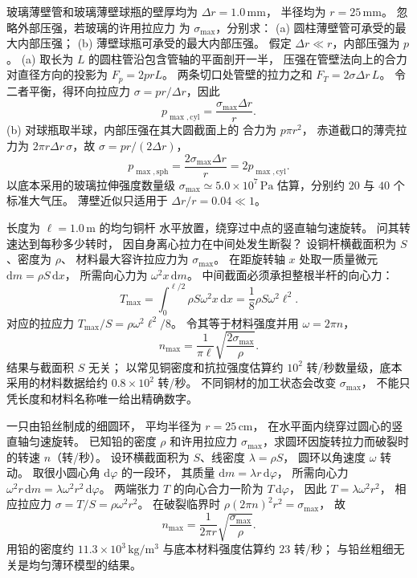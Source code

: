 
玻璃薄壁管和玻璃薄壁球瓶的壁厚均为
$\Delta r=1.0\,\mathrm{mm}$，
半径均为 $r=25\,\mathrm{mm}$。
忽略外部压强，若玻璃的许用拉应力
为 $\sigma_{\max}$，分别求：
(a) 圆柱薄壁管可承受的最大内部压强；
(b) 薄壁球瓶可承受的最大内部压强。
\exsolution
假定 $\Delta r\ll r$，内部压强为 $p$。
(a) 取长为 $L$ 的圆柱管沿包含管轴的平面剖开一半，
压强在管壁法向上的合力对直径方向的投影为
$F_p=2prL$。
两条切口处管壁的拉力之和
$F_T=2\sigma\Delta r\,L$。
令二者平衡，得环向拉应力
$\sigma=pr/\Delta r$，因此
\[
\boxed{p_{\max,\mathrm{cyl}}=
\frac{\sigma_{\max}\Delta r}{r}}.
\]
(b) 对球瓶取半球，内部压强在其大圆截面上的
合力为 $p\pi r^2$，
赤道截口的薄壳拉力为
$2\pi r\Delta r\,\sigma$，故
$\sigma=pr/(2\Delta r)$，
\[
\boxed{p_{\max,\mathrm{sph}}=
\frac{2\sigma_{\max}\Delta r}{r}
=2p_{\max,\mathrm{cyl}}}.
\]
\excheck 以底本采用的玻璃拉伸强度数量级
$\sigma_{\max}\simeq5.0\times10^7\,\mathrm{Pa}$
估算，分别约 $20$ 与 $40$ 个标准大气压。
薄壁近似只适用于 $\Delta r/r=0.04\ll1$。

长度为 $\ell=1.0\,\mathrm m$ 的均匀铜杆
水平放置，绕穿过中点的竖直轴匀速旋转。
问其转速达到每秒多少转时，
因自身离心拉力在中间处发生断裂？
\exsolution
设铜杆横截面积为 $S$、密度为 $\rho$、
材料最大容许拉应力为 $\sigma_{\max}$。
在距旋转轴 $x$ 处取一质量微元
$\mathrm dm=\rho S\,\mathrm dx$，
所需向心力为
$\omega^2x\,\mathrm dm$。
中间截面必须承担整根半杆的向心力：
\[
T_{\max}=\int_0^{\ell/2}
\rho S\omega^2x\,\mathrm dx
=\frac18\rho S\omega^2\ell^2.
\]
对应的拉应力
$T_{\max}/S=\rho\omega^2\ell^2/8$。
令其等于材料强度并用
$\omega=2\pi n$，
\[
\boxed{n_{\max}=
\frac1{\pi\ell}\sqrt{\frac{2\sigma_{\max}}{\rho}}}.
\]
\excheck 结果与截面积 $S$ 无关；
以常见铜密度和抗拉强度估算约
$10^2$ 转/秒数量级，底本采用的材料数据给约
$0.8\times10^2$ 转/秒。
不同铜材的加工状态会改变 $\sigma_{\max}$，
不能只凭长度和材料名称唯一给出精确数字。

一只由铅丝制成的细圆环，
平均半径为 $r=25\,\mathrm{cm}$，
在水平面内绕穿过圆心的竖直轴匀速旋转。
已知铅的密度 $\rho$ 和许用拉应力
$\sigma_{\max}$，求圆环因旋转拉力而破裂时的转速
$n$（转/秒）。
\exsolution
设环横截面积为 $S$、线密度
$\lambda=\rho S$，
圆环以角速度 $\omega$ 转动。
取很小圆心角 $\mathrm d\varphi$ 的一段环，
其质量
$\mathrm dm=\lambda r\,\mathrm d\varphi$，
所需向心力
$\omega^2 r\,\mathrm dm=
\lambda\omega^2r^2\,\mathrm d\varphi$。
两端张力 $T$ 的向心合力一阶为
$T\,\mathrm d\varphi$，
因此 $T=\lambda\omega^2r^2$，
相应拉应力
$\sigma=T/S=\rho\omega^2r^2$。
在破裂临界时
$\rho(2\pi n)^2r^2=\sigma_{\max}$，
故
\[
\boxed{n_{\max}=\frac1{2\pi r}
\sqrt{\frac{\sigma_{\max}}{\rho}}}.
\]
\excheck 用铅的密度约
$11.3\times10^3\,\mathrm{kg/m^3}$
与底本材料强度估算约 $23$ 转/秒；
与铅丝粗细无关是均匀薄环模型的结果。


